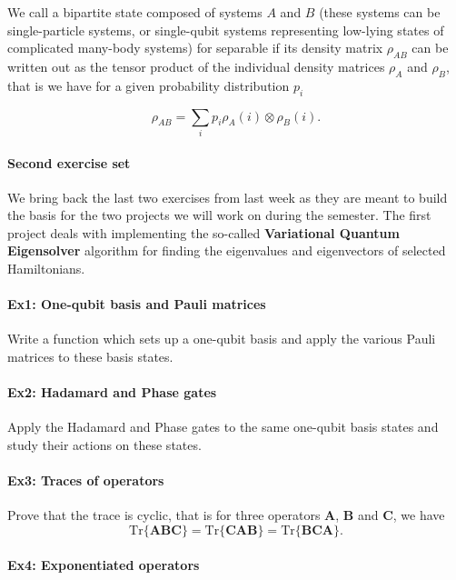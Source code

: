 We call a bipartite state composed of systems $A$ and $B$ (these
systems can be single-particle systems, or single-qubit systems
representing low-lying states of complicated many-body systems) for
separable if its density matrix $\rho_{AB}$ can be written out as the
tensor product of the individual density matrices $\rho_A$ and
$\rho_B$, that is we have for a given probability distribution $p_i$

\[
\rho_{AB}=\sum_ip_i\rho_A(i)\otimes \rho_B(i).
\]


\paragraph{Second exercise set}

We bring back the  last two exercises from last week as they are meant to build the basis for
the two projects we will work on during the semester.  The first
project deals with implementing the so-called
\textbf{Variational Quantum Eigensolver} algorithm for finding the eigenvalues and eigenvectors of selected Hamiltonians.


\paragraph{Ex1: One-qubit basis and  Pauli matrices}

Write a function which sets up a one-qubit basis and apply the various Pauli matrices to these basis states.


\paragraph{Ex2: Hadamard and Phase gates}

Apply the Hadamard and Phase gates to the same one-qubit basis states and study their actions on these states.


\paragraph{Ex3: Traces of operators}

Prove that the trace is cyclic, that is for three operators $\bm{A}$, $\bm{B}$ and $\bm{C}$, we have
\[
\mathrm{Tr}\{\bm{ABC}\}=\mathrm{Tr}\{\bm{CAB}\}=\mathrm{Tr}\{\bm{BCA}\}.
\]


\paragraph{Ex4: Exponentiated operators}

